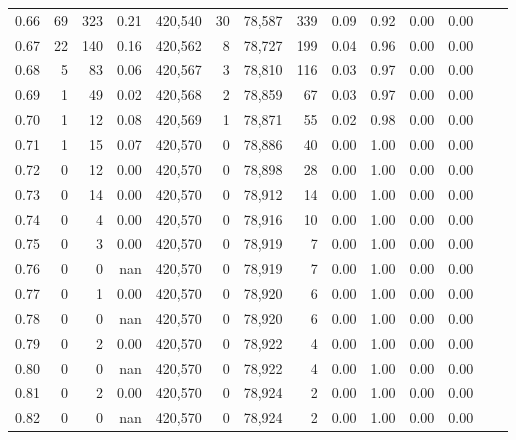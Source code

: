 \begin{tabular}{rrrrrrrrrrrrrr}
0.66 &      69 &    323 &     0.21 &  420,540 &       30 &  78,587 &     339 &  0.09 &  0.92 &  0.00 &      0.00 \\
0.67 &      22 &    140 &     0.16 &  420,562 &        8 &  78,727 &     199 &  0.04 &  0.96 &  0.00 &      0.00 \\
0.68 &       5 &     83 &     0.06 &  420,567 &        3 &  78,810 &     116 &  0.03 &  0.97 &  0.00 &      0.00 \\
0.69 &       1 &     49 &     0.02 &  420,568 &        2 &  78,859 &      67 &  0.03 &  0.97 &  0.00 &      0.00 \\
0.70 &       1 &     12 &     0.08 &  420,569 &        1 &  78,871 &      55 &  0.02 &  0.98 &  0.00 &      0.00 \\
0.71 &       1 &     15 &     0.07 &  420,570 &        0 &  78,886 &      40 &  0.00 &  1.00 &  0.00 &      0.00 \\
0.72 &       0 &     12 &     0.00 &  420,570 &        0 &  78,898 &      28 &  0.00 &  1.00 &  0.00 &      0.00 \\
0.73 &       0 &     14 &     0.00 &  420,570 &        0 &  78,912 &      14 &  0.00 &  1.00 &  0.00 &      0.00 \\
0.74 &       0 &      4 &     0.00 &  420,570 &        0 &  78,916 &      10 &  0.00 &  1.00 &  0.00 &      0.00 \\
0.75 &       0 &      3 &     0.00 &  420,570 &        0 &  78,919 &       7 &  0.00 &  1.00 &  0.00 &      0.00 \\
0.76 &       0 &      0 &      nan &  420,570 &        0 &  78,919 &       7 &  0.00 &  1.00 &  0.00 &      0.00 \\
0.77 &       0 &      1 &     0.00 &  420,570 &        0 &  78,920 &       6 &  0.00 &  1.00 &  0.00 &      0.00 \\
0.78 &       0 &      0 &      nan &  420,570 &        0 &  78,920 &       6 &  0.00 &  1.00 &  0.00 &      0.00 \\
0.79 &       0 &      2 &     0.00 &  420,570 &        0 &  78,922 &       4 &  0.00 &  1.00 &  0.00 &      0.00 \\
0.80 &       0 &      0 &      nan &  420,570 &        0 &  78,922 &       4 &  0.00 &  1.00 &  0.00 &      0.00 \\
0.81 &       0 &      2 &     0.00 &  420,570 &        0 &  78,924 &       2 &  0.00 &  1.00 &  0.00 &      0.00 \\
0.82 &       0 &      0 &      nan &  420,570 &        0 &  78,924 &       2 &  0.00 &  1.00 &  0.00 &      0.00 \\

\end{tabular}
